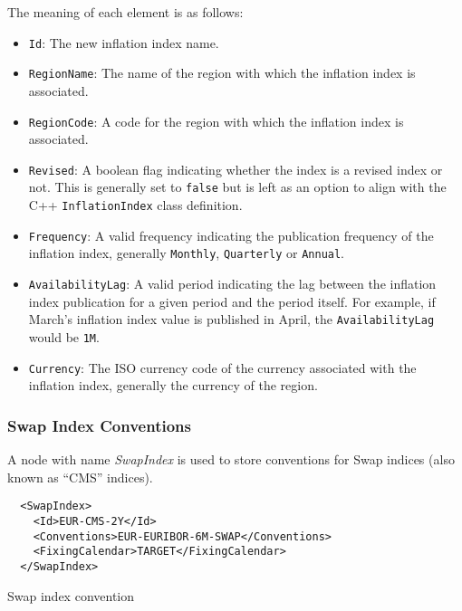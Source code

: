 The meaning of each element is as follows:
\begin{itemize}
\item \lstinline!Id!: The new inflation index name.
\item \lstinline!RegionName!: The name of the region with which the inflation index is associated.
\item \lstinline!RegionCode!: A code for the region with which the inflation index is associated.
\item \lstinline!Revised!: A boolean flag indicating whether the index is a revised index or not. This is generally set to \lstinline!false! but is left as an option to align with the C++ \lstinline!InflationIndex! class definition.
\item \lstinline!Frequency!: A valid frequency indicating the publication frequency of the inflation index, generally \lstinline!Monthly!, \lstinline!Quarterly! or \lstinline!Annual!.
\item \lstinline!AvailabilityLag!: A valid period indicating the lag between the inflation index publication for a given period and the period itself. For example, if March's inflation index value is published in April, the \lstinline!AvailabilityLag! would be \lstinline!1M!.
\item \lstinline!Currency!: The ISO currency code of the currency associated with the inflation index, generally the currency of the region.
\end{itemize}

\subsubsection{Swap Index Conventions}

A node with name \emph{SwapIndex} is used to store conventions for Swap indices (also known as ``CMS'' indices).

\begin{listing}[H]
\begin{verbatim}
  <SwapIndex>
    <Id>EUR-CMS-2Y</Id>
    <Conventions>EUR-EURIBOR-6M-SWAP</Conventions>
    <FixingCalendar>TARGET</FixingCalendar>
  </SwapIndex>
\end{verbatim}
\caption{Swap index convention}
\label{lst:swap_index_conventions}
\end{listing}

